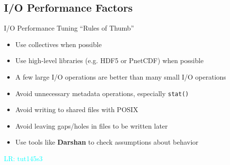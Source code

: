 \documentclass[compress,11pt,xcolor=svgnames,aspectratio=169]{beamer}
\newcommand{\lr}[1]{\textcolor{cyan}{LR: #1}}
\begin{document}
\subsection{I/O Performance Factors}

\begin{frame}[t]{I/O Performance Tuning ``Rules of Thumb''}

\begin{itemize}
\setlength\itemsep{0.3cm}

  \item Use collectives when possible

  \item Use high-level libraries (e.g. HDF5 or PnetCDF) when possible

  \item A few large I/O operations are better than many small I/O operations

  \item Avoid unnecessary metadata operations, especially \texttt{stat()}

  \item Avoid writing to shared files with POSIX

  \item Avoid leaving gaps/holes in files to be written later

  \item Use tools like \textbf{Darshan} to check assumptions about behavior

\end{itemize}


\lr{tut145s3}

\end{frame}
\end{document}
